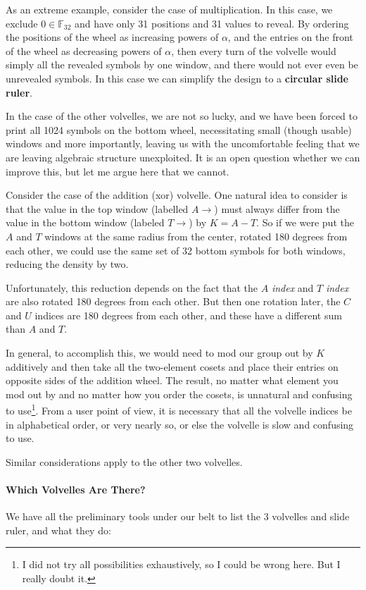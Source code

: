 \documentclass[letterpaper]{article}
\theoremstyle{xxx}
\theoremstyle{evil}
\theoremstyle{yyy}
\theoremstyle{plain}
\theoremstyle{zzz}
\newcommand{\fttwo}{\mathbb{F}_{32}}
\begin{document}
As an extreme example, consider the case of multiplication. In this case, we
exclude $0\in\fttwo$ and have only 31 positions and 31 values to reveal. By
ordering the positions of the wheel as increasing powers of $\alpha$, and the
entries on the front of the wheel as decreasing powers of $\alpha$, then every
turn of the volvelle would simply all the revealed symbols by one window, and
there would not ever even be unrevealed symbols. In this case we can simplify
the design to a \textbf{circular slide ruler}.


In the case of the other volvelles, we are not so lucky, and we have been forced
to print all 1024 symbols on the bottom wheel, necessitating small (though usable)
windows and more importantly, leaving us with the uncomfortable feeling that we
are leaving algebraic structure unexploited. It is an open question whether we can
improve this, but let me argue here that we cannot.

Consider the case of the addition (xor) volvelle. One natural idea to consider
is that the value in the top window (labelled $A\rightarrow$) must always differ
from the value in the bottom window (labeled $T\rightarrow$) by $K=A-T$. So
if we were put the $A$ and $T$ windows at the same radius from the center, rotated
180 degrees from each other, we could use the same set of 32 bottom symbols for
both windows, reducing the density by two.

Unfortunately, this reduction depends on the fact that the $A$ \emph{index} and
$T$ \emph{index} are also rotated 180 degrees from each other. But then one rotation
later, the $C$ and $U$ indices are 180 degrees from each other, and these have a
different sum than $A$ and $T$.

In general, to accomplish this, we would need to mod our group out by $K$ additively
and then take all the two-element cosets and place their entries on opposite sides
of the addition wheel. The result, no matter what element you mod out by and no matter
how you order the cosets, is unnatural and confusing to use\footnote{I did not try
all possibilities exhaustively, so I could be wrong here. But I really doubt it.}.
From a user point of view, it is necessary that all the volvelle indices be in
alphabetical order, or very nearly so, or else the volvelle is slow and confusing
to use.

Similar considerations apply to the other two volvelles.

\paragraph{Which Volvelles Are There?} We have all the preliminary tools under
our belt to list the 3 volvelles and slide ruler, and what they do:
\end{document}
